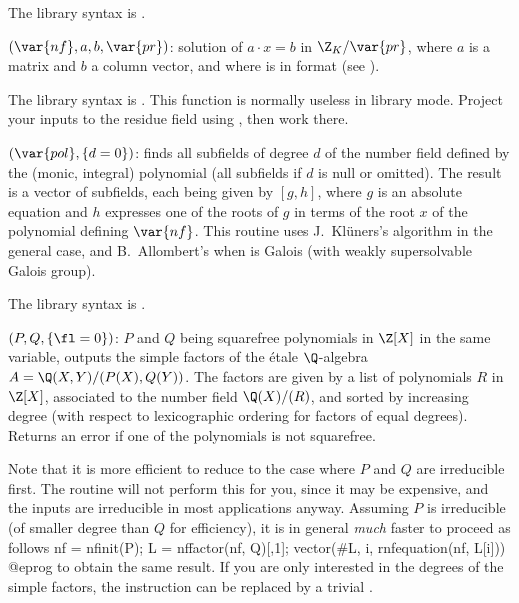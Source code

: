 The library syntax is .

$(\var{nf},a,b,\var{pr})$: \label{se:nfsolvemodpr}solution of $a\cdot x = b$
in $\Z_K/\var{pr}$, where $a$ is a matrix and $b$ a column vector, and where
 is in  format (see ).

The library syntax is .
This function is normally useless in library mode. Project your
inputs to the residue field using , then work there.

$(\var{pol},\{d=0\})$: \label{se:nfsubfields}finds all subfields of degree
$d$ of the number field defined by the (monic, integral) polynomial
 (all subfields if $d$ is null or omitted). The result is a vector
of subfields, each being given by $[g,h]$, where $g$ is an absolute equation
and $h$ expresses one of the roots of $g$ in terms of the root $x$ of the
polynomial defining $\var{nf}$. This routine uses J.~Kl\"uners's algorithm
in the general case, and B.~Allombert's  when 
is Galois (with weakly supersolvable Galois group).

The library syntax is .

$(P,Q,\{\fl=0\})$: \label{se:polcompositum} $P$ and $Q$
being squarefree polynomials in $\Z[X]$ in the same variable, outputs
the simple factors of the \'etale $\Q$-algebra $A = \Q(X, Y) / (P(X), Q(Y))$.
The factors are given by a list of polynomials $R$ in $\Z[X]$, associated to
the number field $\Q(X)/ (R)$, and sorted by increasing degree (with respect
to lexicographic ordering for factors of equal degrees). Returns an error if
one of the polynomials is not squarefree.

Note that it is more efficient to reduce to the case where $P$ and $Q$ are
irreducible first. The routine will not perform this for you, since it may be
expensive, and the inputs are irreducible in most applications anyway.
Assuming $P$ is irreducible (of smaller degree than $Q$ for efficiency), it
is in general \emph{much} faster to proceed as follows
\bprog
nf = nfinit(P); L = nffactor(nf, Q)[,1];
vector(#L, i, rnfequation(nf, L[i]))
@eprog\noindent
to obtain the same result. If you are only interested in the degrees of the
simple factors, the  instruction can be replaced by a
trivial .

